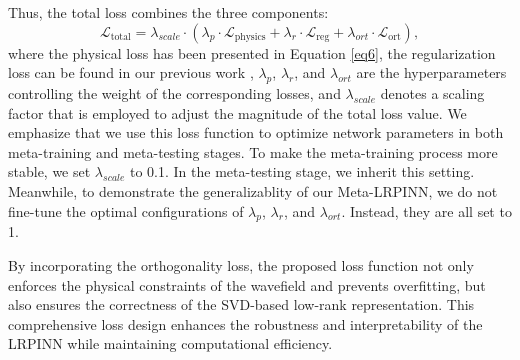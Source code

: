 Thus, the total loss combines the three components: 
\begin{equation}\label{eq23} 
\mathcal{L}_{\text{total}} = \lambda_{scale} \cdot (\lambda_p \cdot \mathcal{L}_{\text{physics}} + \lambda_r \cdot\mathcal{L}_{\text{reg}} + \lambda_{ort} \cdot \mathcal{L}_{\text{ort}}),
\end{equation}
where the physical loss has been presented in Equation \ref{eq6}, the regularization loss can be found in our previous work \citep{cheng2025meta}, $\lambda_p$, $\lambda_r$, and $\lambda_{ort}$ are the hyperparameters controlling the weight of the corresponding losses, and $\lambda_{scale}$ denotes a scaling factor that is employed to adjust the magnitude of the total loss value. We emphasize that we use this loss function to optimize network parameters in both meta-training and meta-testing stages. To make the meta-training process more stable, we set $\lambda_{scale}$ to 0.1. In the meta-testing stage, we inherit this setting. Meanwhile, to demonstrate the generalizablity of our Meta-LRPINN, we do not fine-tune the optimal configurations of $\lambda_p$, $\lambda_r$, and $\lambda_{ort}$. Instead, they are all set to 1.

By incorporating the orthogonality loss, the proposed loss function not only enforces the physical constraints of the wavefield and prevents overfitting, but also ensures the correctness of the SVD-based low-rank representation. This comprehensive loss design enhances the robustness and interpretability of the LRPINN while maintaining computational efficiency.